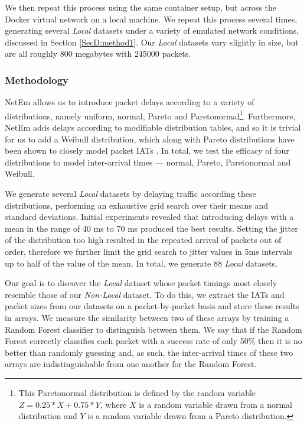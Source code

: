 We then repeat this process using the same container setup, but across the Docker virtual network on a local machine. We repeat this process several times, generating several \textit{Local} datasets under a variety of emulated network conditions, discussed in Section \ref{SecD:method1}. Our \textit{Local} datasets vary slightly in size, but are all roughly 800 megabytes with 245000 packets. %


\subsubsection*{Methodology}
\label{SecD:method1}


NetEm allows us to introduce packet delays according to a variety of distributions, namely uniform, normal, Pareto and Paretonormal\footnote{This Paretonormal distribution is defined by the random variable $Z = 0.25*X + 0.75*Y$, where $X$ is a random variable drawn from a normal distribution and $Y$ is a random variable drawn from a Pareto distribution.}. Furthermore, NetEm adds delays according to modifiable distribution tables, and so it is trivial for us to add a Weibull distribution, which along with Pareto distributions have been shown to closely model packet IATs \cite{arfeen2013role,paxson1995wide}.
In total, we test the efficacy of four distributions to model inter-arrival times --- normal, Pareto, Paretonormal and Weibull. 
 
We generate several \textit{Local} datasets by delaying traffic according these distributions, performing an exhaustive grid search over their means and standard deviations. Initial experiments revealed that introducing delays with a mean in the range of 40 ms to 70 ms produced the best results. Setting the jitter of the distribution too high resulted in the repeated arrival of packets out of order, therefore we further limit the grid search to jitter values in 5ms intervals up to half of the value of the mean. In total, we generate 88 \textit{Local} datasets.

Our goal is to discover the \textit{Local} dataset whose packet timings most closely resemble those of our \textit{Non-Local} dataset. To do this, we extract the IATs and packet sizes from our datasets on a packet-by-packet basis and store these results in arrays. We measure the similarity between two of these arrays by training a Random Forest classifier to distinguish between them. We say that if the Random Forest correctly classifies each packet with a success rate of only 50\% then it is no better than randomly guessing and, as such, the inter-arrival times of these two arrays are indistinguishable from one another for the Random Forest.

